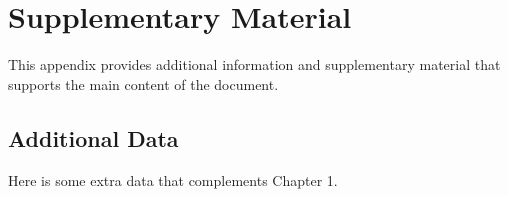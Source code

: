 \appendix
\chapter{Supplementary Material}
This appendix provides additional information and supplementary material that supports the main content of the document.

\section{Additional Data}
Here is some extra data that complements Chapter 1.
